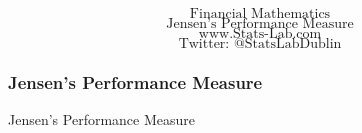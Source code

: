 \documentclass{beamer}
\begin{document}
\begin{frame}
\Huge
\[ \mbox{Financial Mathematics}  \]
\huge
\[ \mbox{Jensen's Performance Measure}\]
\Large
\[ \mbox{www.Stats-Lab.com}   \]
\[ \mbox{Twitter: @StatsLabDublin} \]
\end{frame}

\begin{frame}
\frametitle{Jensen's Performance Measure}
\Large
 Jensen's Performance Measure
 


\end{frame}
\end{document}
